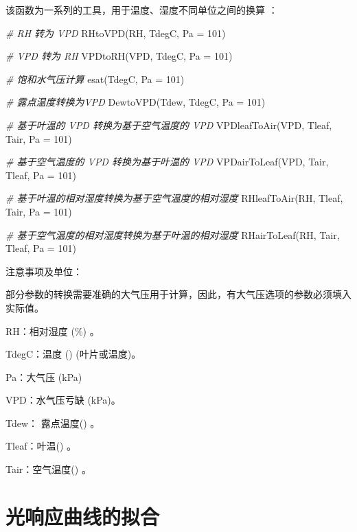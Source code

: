 \documentclass[
]{krantz}
\makeatletter
\newenvironment{Shaded}{\begin{snugshade}}{\end{snugshade}}
\newcommand{\AttributeTok}[1]{\textcolor[rgb]{0.77,0.63,0.00}{#1}}
\newcommand{\CommentTok}[1]{\textcolor[rgb]{0.56,0.35,0.01}{\textit{#1}}}
\newcommand{\DecValTok}[1]{\textcolor[rgb]{0.00,0.00,0.81}{#1}}
\newcommand{\FunctionTok}[1]{\textcolor[rgb]{0.00,0.00,0.00}{#1}}
\newcommand{\NormalTok}[1]{#1}
\newenvironment{kframe}{%
\medskip{}
\setlength{\fboxsep}{.8em}
 \def\at@end@of@kframe{}%
 \ifinner\ifhmode%
  \def\at@end@of@kframe{\end{minipage}}%
  \begin{minipage}{\columnwidth}%
 \fi\fi%
 \def\FrameCommand##1{\hskip\@totalleftmargin \hskip-\fboxsep
 \colorbox{shadecolor}{##1}\hskip-\fboxsep
     \hskip-\linewidth \hskip-\@totalleftmargin \hskip\columnwidth}%
 \MakeFramed {\advance\hsize-\width
   \@totalleftmargin\z@ \linewidth\hsize
   \@setminipage}}%
 {\par\unskip\endMakeFramed%
 \at@end@of@kframe}
\renewenvironment{Shaded}{\begin{kframe}}{\end{kframe}}
\makeatother
\begin{document}
该函数为一系列的工具，用于温度、湿度不同单位之间的换算 \citet{Jones1993Plants} ：

\begin{Shaded}
\begin{Highlighting}[]
\CommentTok{\# RH 转为 VPD  }
\FunctionTok{RHtoVPD}\NormalTok{(RH, TdegC, }\AttributeTok{Pa =} \DecValTok{101}\NormalTok{) }
 
\CommentTok{\# VPD 转为 RH   }
\FunctionTok{VPDtoRH}\NormalTok{(VPD, TdegC, }\AttributeTok{Pa =} \DecValTok{101}\NormalTok{) }
 
\CommentTok{\#  饱和水气压计算 }
\FunctionTok{esat}\NormalTok{(TdegC, }\AttributeTok{Pa =} \DecValTok{101}\NormalTok{) }
 
\CommentTok{\#  露点温度转换为VPD }
\FunctionTok{DewtoVPD}\NormalTok{(Tdew, TdegC, }\AttributeTok{Pa =} \DecValTok{101}\NormalTok{) }
 
\CommentTok{\#  基于叶温的 VPD 转换为基于空气温度的 VPD}
\FunctionTok{VPDleafToAir}\NormalTok{(VPD, Tleaf, Tair, }\AttributeTok{Pa =} \DecValTok{101}\NormalTok{) }
 
\CommentTok{\#  基于空气温度的 VPD 转换为基于叶温的 VPD }
\FunctionTok{VPDairToLeaf}\NormalTok{(VPD, Tair, Tleaf, }\AttributeTok{Pa =} \DecValTok{101}\NormalTok{) }
 
\CommentTok{\#  基于叶温的相对湿度转换为基于空气温度的相对湿度  }
\FunctionTok{RHleafToAir}\NormalTok{(RH, Tleaf, Tair, }\AttributeTok{Pa =} \DecValTok{101}\NormalTok{) }
 
\CommentTok{\#  基于空气温度的相对湿度转换为基于叶温的相对湿度  }
\FunctionTok{RHairToLeaf}\NormalTok{(RH, Tair, Tleaf, }\AttributeTok{Pa =} \DecValTok{101}\NormalTok{) }
\end{Highlighting}
\end{Shaded}

注意事项及单位：

部分参数的转换需要准确的大气压用于计算，因此，有大气压选项的参数必须填入实际值。

RH：相对湿度 (\%) 。

TdegC：温度 (\textcelsius) (叶片或温度)。

Pa：大气压 (kPa)

VPD：水气压亏缺 (kPa)。

Tdew： 露点温度(\textcelsius) 。

Tleaf：叶温(\textcelsius) 。

Tair：空气温度(\textcelsius) 。

\cleardoublepage

\hypertarget{lrc_fit}{%
\chapter{光响应曲线的拟合}\label{lrc_fit}}
\end{document}
